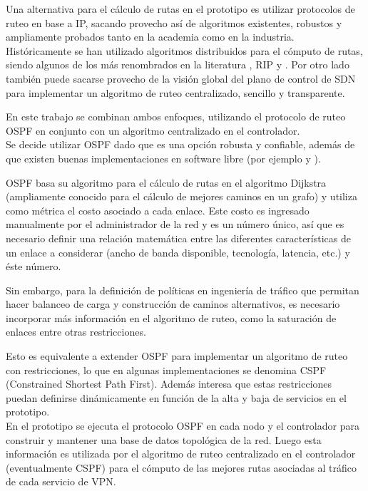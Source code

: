 Una alternativa para el c\'alculo de rutas en el prototipo es utilizar protocolos de ruteo en base a IP, sacando provecho as\'i de algoritmos existentes, robustos y ampliamente probados tanto en la academia como en la industria.\\

Hist\'oricamente se han utilizado algoritmos distribuidos para el c\'omputo de rutas, siendo algunos de los m\'as renombrados en la literatura \cite{moy1998rfc}, RIP\cite{malkin1994rip} y \cite{routingprotocol}. Por otro lado también puede sacarse provecho de la visi\'on global del plano de control de SDN para implementar un algoritmo de ruteo centralizado, sencillo y transparente.

En este trabajo se combinan ambos enfoques, utilizando el protocolo de ruteo OSPF en conjunto con un algoritmo centralizado en el controlador.\\

Se decide utilizar OSPF dado que es una opción robusta y confiable, adem\'as de que existen buenas implementaciones en software libre (por ejemplo \cite{Quagga} y \cite{BIRD}).

OSPF basa su algoritmo para el c\'alculo de rutas en el algoritmo Dijkstra (ampliamente conocido para el c\'alculo de mejores caminos en un grafo) y utiliza como m\'etrica el costo asociado a cada enlace. Este costo es ingresado manualmente por el administrador de la red y es un n\'umero \'unico, as\'i que es necesario definir una relaci\'on matem\'atica entre las diferentes caracter\'isticas de un enlace a considerar (ancho de banda disponible, tecnolog\'ia, latencia, etc.) y \'este n\'umero.

Sin embargo, para la definición de políticas en ingeniería de tr\'afico que permitan hacer balanceo de carga y construcción de caminos alternativos, es necesario incorporar m\'as informaci\'on en el algoritmo de ruteo, como la saturaci\'on de enlaces entre otras restricciones.

Esto es equivalente a extender OSPF para implementar un algoritmo de ruteo con restricciones, lo que en algunas implementaciones se denomina CSPF (Constrained Shortest Path First). Adem\'as interesa que estas restricciones puedan definirse din\'amicamente en función de la alta y baja de servicios en el prototipo.\\

En el prototipo se ejecuta el protocolo OSPF en cada nodo y el controlador para construir y mantener una base de datos topol\'ogica de la red. Luego esta información es utilizada por el algoritmo de ruteo centralizado en el controlador (eventualmente CSPF) para el c\'omputo de las mejores rutas asociadas al tr\'afico de cada servicio de VPN.\\


